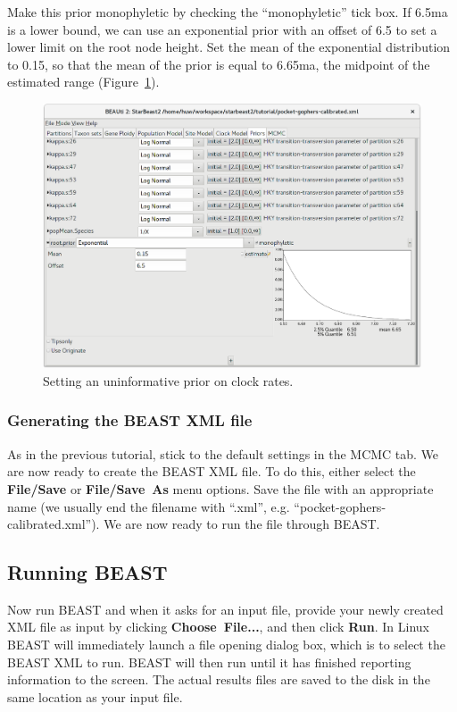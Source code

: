 \documentclass{article}
\begin{document}
Make this prior monophyletic by checking the ``monophyletic'' tick box. If
6.5ma is a lower bound, we can use an exponential prior with an offset of 6.5
to set a lower limit on the root node height. Set the mean of the exponential
distribution to 0.15, so that the mean of the prior is equal to 6.65ma, the
midpoint of the estimated range (Figure~\ref{fig:mrca-prior}).

\begin{figure}[htb!]
\centering
\includegraphics[width=\textwidth]{figures/beauti-mrca-prior.png}
\caption{Setting an uninformative prior on clock rates.}
\label{fig:mrca-prior}
\end{figure}

\clearpage

\subsubsection*{Generating the BEAST XML file}

As in the previous tutorial, stick to the default settings in the MCMC tab.
We are now ready to create the BEAST XML file. To do this, either select the
\textbf{File/Save} or \textbf{File/Save~As} menu options. Save the file with an
appropriate name (we usually end the filename with ``.xml'', e.g.
``pocket-gophers-calibrated.xml''). We are now ready to run the file through BEAST.

\subsection*{Running BEAST}

Now run BEAST and when it asks for an input file, provide your newly created XML
file as input by clicking \textbf{Choose~File...}, and then click \textbf{Run}.
In Linux BEAST will immediately launch a file opening dialog box, which is to
select the BEAST XML to run. BEAST will then run until it has finished reporting
information to the screen. The actual results files are saved to the disk in the
same location as your input file.
\end{document}
